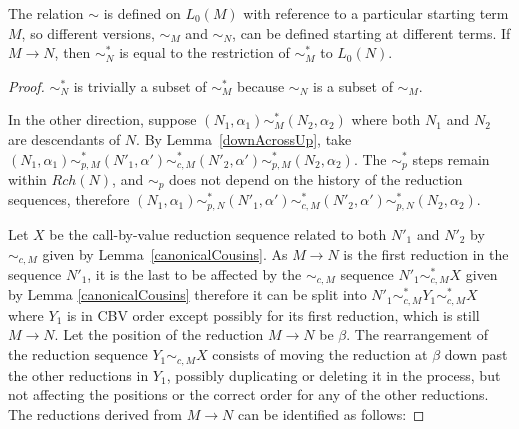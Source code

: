 \begin{lemma}
\label{lem:sim-M-N}
The relation $\sim$ is defined on $L_0(M)$ with reference to a particular starting term $M$, so different versions, $\sim_M$ and $\sim_N$, can be defined starting at different terms. If $M \to N$, then $\sim^*_N$ is equal to the restriction of $\sim^*_M$ to $L_0(N)$.
\end{lemma} 

\begin{proof}
$\sim_N^*$ is trivially a subset of $\sim_M^*$ because $\sim_N$ is a subset of $\sim_M$.

In the other direction, suppose $(N_1, \alpha_1) \sim_M^* (N_2, \alpha_2)$ where both $N_1$ and $N_2$ are descendants of $N$. By Lemma~\ref{downAcrossUp}, take $(N_1, \alpha_1) \sim_{p,M}^* (N'_1, \alpha') \sim_{c,M}^* (N'_2, \alpha') \sim_{p,M}^* (N_2, \alpha_2)$. 
The $\sim_p^*$ steps remain within $Rch(N)$, and $\sim_p$ does not depend on the history of the reduction sequences, therefore $(N_1, \alpha_1) \sim_{p,N}^* (N'_1, \alpha') \sim_{c,M}^* (N'_2, \alpha') \sim_{p,N}^* (N_2, \alpha_2)$.

Let $X$ be the call-by-value reduction sequence related to both $N'_1$ and $N'_2$ by $\sim_{c,M}$ given by Lemma~\ref{canonicalCousins}. 
As $M \to N$ is the first reduction in the sequence $N'_1$, it is the last to be affected by the $\sim_{c,M}$ sequence $N'_1 \sim_{c,M}^* X$ given by Lemma \ref{canonicalCousins} therefore it can be split into $N'_1 \sim_{c,M}^* Y_1 \sim_{c,M}^* X$ where $Y_1$ is in CBV order except possibly for its first reduction, which is still $M \to N$. Let the position of the reduction $M \to N$ be $\beta$. 
The rearrangement of the reduction sequence $Y_1 \sim_{c,M} X$ consists of moving the reduction at $\beta$ down past the other reductions in $Y_1$, possibly duplicating or deleting it in the process, but not affecting the positions or the correct order for any of the other reductions. 
The reductions derived from $M \to N$ can be identified as follows:


\end{proof}
